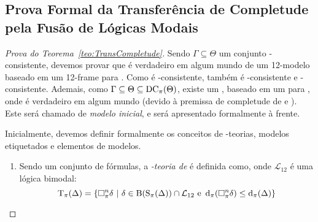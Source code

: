 

\begin{apendicesenv}

    \chapter{Prova Formal da Transferência de Completude pela Fusão de Lógicas Modais}
        \label{app:ProvaTransferenciaCompletude}

        \begin{proof}[Prova do Teorema~\ref{teo:TransCompletude}]
            Sendo \(\Gamma \subseteq \Theta\) um conjunto -consistente, devemos provar que \GAMMA é verdadeiro em algum mundo de um 12-modelo baseado
            em um 12-frame para . Como \GAMMA é -consistente, \GAMMA também é -consistente e -consistente. Ademais, como
            \(\Gamma \subseteq \Theta \subseteq \operatorname{DC}_{\pi}(\Theta)\), existe um \PImodelo, baseado em um \PIframe para , onde \GAMMA é verdadeiro em
            algum mundo (devido à premissa de completude de  e ). Este \PImodelo será chamado de \textit{modelo inicial}, e será apresentado
            formalmente à frente.

            Inicialmente, devemos definir formalmente os conceitos de \PI-teorias, modelos etiquetados e elementos de modelos.
            \begin{definicao}
                \label{def:Definicao1}
                \phantom{a}
                \begin{enumerate}[label=\textnormal{\ref{def:Definicao1}.\arabic*}]
                    \item Sendo \DDELTA um conjunto de fórmulas, a \textit{\PI-teoria de \DDELTA} é definida como, onde \(\mathcal{L}_{12}\) é uma lógica bimodal:\label{caso:Definicao1-1}
                    \[
                        \operatorname{T}_{\pi}(\Delta) = \{\Box^{n}_{\pi} \delta \ | \ \delta \in \operatorname{B}(\operatorname{S}_{\pi}(\Delta)) \cap \mathcal{L}_{12} \text{ e }
                            \operatorname{d}_\pi(\Box^{n}_{\pi} \delta) \leq \operatorname{d}_\pi(\Delta) \}
                    \]


\end{enumerate}
\end{definicao}
\end{proof}
\end{apendicesenv}
